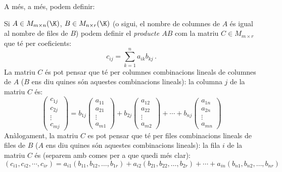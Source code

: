 A més, a més, podem definir:
\begin{definicio}
	Si $A \in M_{m\times n}(\K)$, $B \in M_{n\times r}(\K)$ (o sigui, el nombre de columnes de $A$ és igual al nombre de files de $B$) podem definir el \emph{producte $AB$} com la matriu $C\in M_{m\times r}$ que té per coeficients:
	\[
	c_{ij}=\sum_{k=1}^{n} a_{ik}b_{kj} \,.
	\]
	La matriu $C$ és pot pensar que té per columnes combinacions lineals de columnes de $A$ ($B$ ens diu quines són aquestes combinacions lineals): la columna $j$ de la matriu $C$ és:
	\[
	\begin{pmatrix}
	c_{1j}\\c_{2j}\\ \vdots \\ c_{mj} 
	\end{pmatrix} =
	b_{1j}	\begin{pmatrix}
	a_{11}\\a_{21}\\ \vdots \\ a_{m1} 
	\end{pmatrix} +
	b_{2j}	\begin{pmatrix}
	a_{12}\\a_{22}\\ \vdots \\ a_{m2} 
	\end{pmatrix} + \cdots +
	b_{nj}	\begin{pmatrix}
	a_{1n}\\a_{2n}\\ \vdots \\ a_{mn} 
	\end{pmatrix}
	\]
	Anàlogament, la matriu $C$ es pot pensar que té per files combinacions lineals de files de $B$ ($A$ ens diu quines són aquestes combinacions lineals): la fila $i$ de la matriu $C$ és (separem amb comes per a que quedi més clar):
	\[
	(c_{i1},c_{i2},\cdots,c_{ir})=
	a_{i1} (b_{11},b_{12},\dots,b_{1r})+
	a_{i2} (b_{21},b_{22},\dots,b_{2r})+ \cdots +
	a_{in} (b_{n1},b_{n2},\dots,b_{nr})
	\]
\end{definicio}
